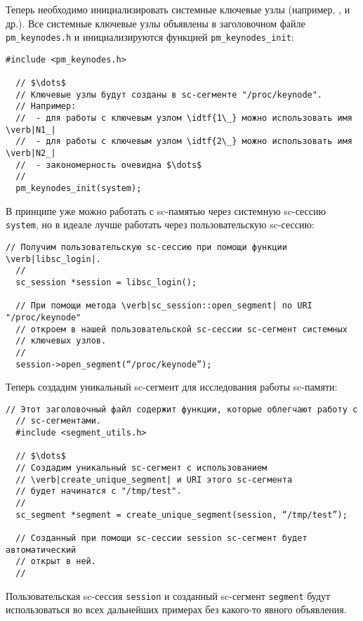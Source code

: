 Теперь необходимо инициализировать системные ключевые узлы (например,
,  и др.). Все системные ключевые узлы объявлены в
заголовочном файле \verb|pm_keynodes.h| и инициализируются функцией
\lstinline{pm_keynodes_init}:

\begin{lstlisting}[texcl]
  #include <pm_keynodes.h>

  // $\dots$
  // Ключевые узлы будут созданы в sc-сегменте "/proc/keynode".
  // Например:
  //  - для работы с ключевым узлом \idtf{1\_} можно использовать имя \verb|N1_|
  //  - для работы с ключевым узлом \idtf{2\_} можно использовать имя \verb|N2_|
  //  - закономерность очевидна $\dots$
  //
  pm_keynodes_init(system);
\end{lstlisting}

В принципе уже можно работать с sc-памятью через системную sc-сессию
\lstinline{system}, но в идеале лучше работать через пользовательскую
sc-сессию:

\begin{lstlisting}[texcl]
  // Получим пользовательскую sc-сессию при помощи функции \verb|libsc_login|.
  //
  sc_session *session = libsc_login();

  // При помощи метода \verb|sc_session::open_segment| по URI "/proc/keynode"
  // откроем в нашей пользовательской sc-сессии sc-сегмент системных
  // ключевых узлов.
  //
  session->open_segment(“/proc/keynode”);
\end{lstlisting}

Теперь создадим уникальный sc-сегмент для исследования работы
sc-памяти:

\begin{lstlisting}[texcl]
  // Этот заголовочный файл содержит функции, которые облегчают работу с
  // sc-сегментами.
  #include <segment_utils.h>

  // $\dots$
  // Создадим уникальный sc-сегмент с использованием
  // \verb|create_unique_segment| и URI этого sc-сегмента
  // будет начинатся с "/tmp/test".
  //
  sc_segment *segment = create_unique_segment(session, “/tmp/test”);

  // Созданный при помощи sc-сессии session sc-сегмент будет автоматический
  // открыт в ней.
  //
\end{lstlisting}

Пользовательская sc-сессия \lstinline{session} и созданный sc-сегмент
\lstinline{segment} будут использоваться во всех дальнейших примерах
без какого-то явного объявления.

